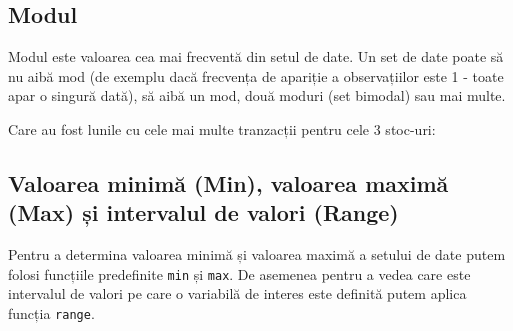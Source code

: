\documentclass[]{article}
\newenvironment{Shaded}{\begin{snugshade}}{\end{snugshade}}
\newcommand{\KeywordTok}[1]{\textcolor[rgb]{0.13,0.29,0.53}{\textbf{#1}}}
\newcommand{\DecValTok}[1]{\textcolor[rgb]{0.00,0.00,0.81}{#1}}
\newcommand{\StringTok}[1]{\textcolor[rgb]{0.31,0.60,0.02}{#1}}
\newcommand{\CommentTok}[1]{\textcolor[rgb]{0.56,0.35,0.01}{\textit{#1}}}
\newcommand{\OperatorTok}[1]{\textcolor[rgb]{0.81,0.36,0.00}{\textbf{#1}}}
\newcommand{\NormalTok}[1]{#1}
\begin{document}
\subsection{Modul}\label{modul}

Modul este valoarea cea mai frecventă din setul de date. Un set de date
poate să nu aibă mod (de exemplu dacă frecvența de apariție a
observațiilor este 1 - toate apar o singură dată), să aibă un mod, două
moduri (set bimodal) sau mai multe.

Care au fost lunile cu cele mai multe tranzacții pentru cele 3 stoc-uri:

\begin{Shaded}
\end{Shaded}

\subsection{Valoarea minimă (Min), valoarea maximă (Max) și intervalul
de valori
(Range)}\label{valoarea-minima-min-valoarea-maxima-max-si-intervalul-de-valori-range}

Pentru a determina valoarea minimă și valoarea maximă a setului de date
putem folosi funcțiile predefinite \texttt{min} și \texttt{max}. De
asemenea pentru a vedea care este intervalul de valori pe care o
variabilă de interes este definită putem aplica funcția \texttt{range}.
\end{document}
